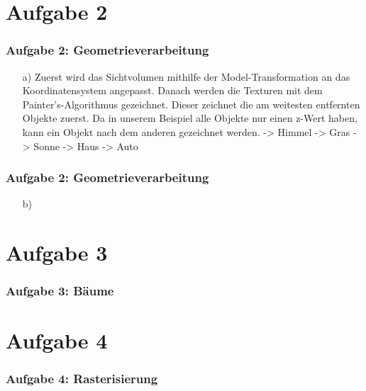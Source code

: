 \documentclass[accentcolor=tud9c,colorbacktitle,inverttitle,landscape,german,presentation,t]{tudbeamer}
\begin{document}
\section{Aufgabe 2}
	\begin{frame}
		\frametitle{Aufgabe 2: Geometrieverarbeitung} %
		\begin{itemize}
		\item[a)] Zuerst wird das Sichtvolumen mithilfe der Model-Transformation an das Koordinatensystem angepasst. Danach werden die Texturen mit dem Painter's-Algorithmus gezeichnet. Dieser zeichnet die am weitesten entfernten Objekte zuerst. Da in unserem Beispiel alle Objekte nur einen z-Wert haben, kann ein Objekt nach dem anderen gezeichnet werden. -> Himmel -> Gras -> Sonne -> Haus -> Auto
		\end{itemize}
	\end{frame}
	\begin{frame}
	\frametitle{Aufgabe 2: Geometrieverarbeitung} %
	\begin{itemize}

		\item[b)]
	\end{itemize}
\end{frame}
	
\section{Aufgabe 3}
	\begin{frame}
		\frametitle{Aufgabe 3: B\"aume} %
	\end{frame}
	
\section{Aufgabe 4}
	\begin{frame}
		\frametitle{Aufgabe 4: Rasterisierung} 
	\end{frame}
\end{document}

